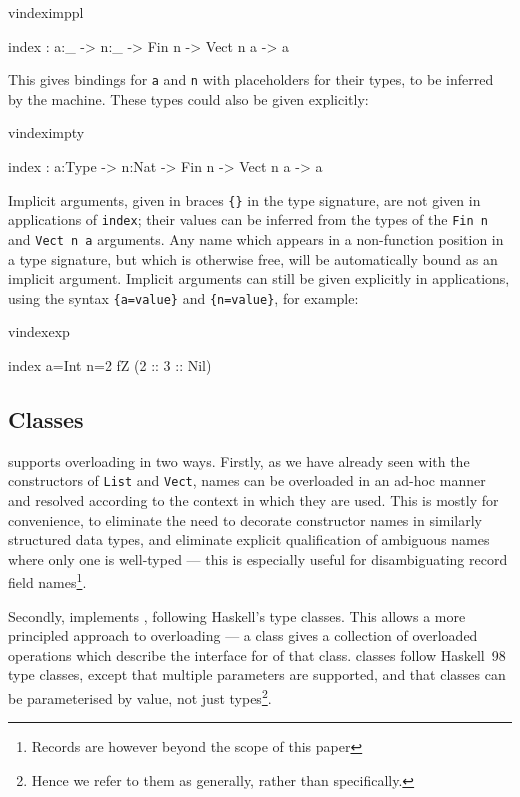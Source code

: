 \begin{SaveVerbatim}{vindeximppl}

index : {a:_} -> {n:_} -> Fin n -> Vect n a -> a

\end{SaveVerbatim}

\noindent
This gives bindings for \texttt{a} and \texttt{n} with placeholders for
their types, to be inferred by the machine. These types could also be given explicitly:

\begin{SaveVerbatim}{vindeximpty}

index : {a:Type} -> {n:Nat} -> Fin n -> Vect n a -> a

\end{SaveVerbatim}

\noindent
Implicit arguments, given in braces \texttt{\{\}} in the type signature, are
not given in applications of \texttt{index}; their values can be inferred from
the types of the \texttt{Fin n} and \texttt{Vect n a} arguments. Any name which
appears in a non-function position in a type signature, but which is otherwise
free, will be automatically bound as an implicit argument.  Implicit arguments
can still be given explicitly in applications, using the syntax
\texttt{\{a=value\}} and \texttt{\{n=value\}}, for example:

\begin{SaveVerbatim}{vindexexp}

index {a=Int} {n=2} fZ (2 :: 3 :: Nil)

\end{SaveVerbatim}

\subsection{Classes}

\Idris{} supports overloading in two ways. Firstly, as we have already seen
with the constructors of \texttt{List} and \texttt{Vect}, names can be
overloaded in an ad-hoc manner and resolved according to the context in which
they are used. This is mostly for convenience, to eliminate the need to
decorate constructor names in similarly structured data types, and eliminate
explicit qualification of ambiguous names where only one is well-typed --- this
is especially useful for disambiguating record field names\footnote{Records are
however beyond the scope of this paper}.

Secondly, \Idris{} implements , following Haskell's type
classes.  This allows a more principled approach to overloading --- a class
gives a collection of overloaded operations which describe the interface for
 of that class. \Idris{} classes follow Haskell~98 type
classes, except that multiple parameters are supported, and that classes can be
parameterised by  value, not just types\footnote{Hence we refer to
them as  generally, rather than 
specifically.}.

